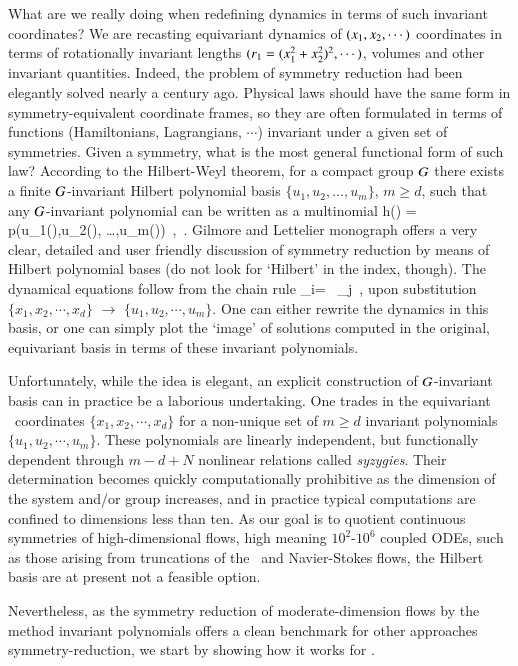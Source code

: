 What are we really doing when redefining dynamics in terms of
such invariant coordinates? We are recasting equivariant
dynamics of $(x_1,x_2,\cdots)$ coordinates in terms of
rotationally invariant lengths
$(r_1=(x_1^2+x_2^2)^2,\cdots)$, volumes and other
invariant quantities. Indeed, the problem of symmetry
reduction had been elegantly solved nearly a century ago.
Physical laws should have the same form in
symmetry-equivalent coordinate frames, so they are often
formulated in terms of functions (Hamiltonians, Lagrangians,
$\cdots$) invariant under a given set of symmetries. Given a
symmetry, what is the most general functional form of such
law? According to the Hilbert-Weyl theorem, for a compact
group $G$ there exists a finite $G${-invariant}
Hilbert polynomial basis $\{u_1,u_2, \dots,u_m\}$, $ m \geq
d$, such that any $G${-invariant} polynomial can be
written as a multinomial
\beq
h(\ssp) = p(u_1(\ssp),u_2(\ssp), \dots,u_m(\ssp))
    \,,\qquad \ssp \in \pS
\,.
Gilmore and Lettelier monograph offers
a very clear, detailed and user friendly discussion of
symmetry reduction by means of Hilbert polynomial bases (do
not look for `Hilbert' in the index, though).
The dynamical equations follow from the chain rule
\beq
 _i= \, _j
 \,,
upon substitution $\{x_1,x_2,\cdots,x_d\}$ $\to$
$\{u_1,u_2,\cdots,u_m\}$. One can either rewrite the dynamics
in this basis, or one can simply plot the `image' of
solutions computed in the original, equivariant basis in
terms of these invariant polynomials.

Unfortunately, while the idea is elegant, an explicit
construction of $G${-invariant} basis can in practice be
a laborious undertaking. One trades in the equivariant
\statesp\ coordinates $\{x_1,x_2,\cdots,x_d\}$ for a
non-unique set  of $m \geq d$ invariant polynomials
$\{u_1,u_2,\cdots,u_m\}$. These polynomials are linearly
independent, but functionally dependent through $m - d + N$
nonlinear relations called \emph{syzygies}. Their
determination becomes quickly computationally prohibitive as
the dimension of the system and/or group
increases, and in practice
typical computations are confined to dimensions less than
ten. As our goal is to quotient continuous symmetries of
high-dimensional flows, high meaning $10^2$-$10^6$ coupled
ODEs, such as those arising from truncations of the \KS\ and
Navier-Stokes flows, the Hilbert basis are at present not a
feasible option.

Nevertheless, as the symmetry reduction of moderate-dimension
flows by the method invariant polynomials offers a clean
benchmark for other approaches symmetry-reduction, we start
by showing how it works for \cLf.
